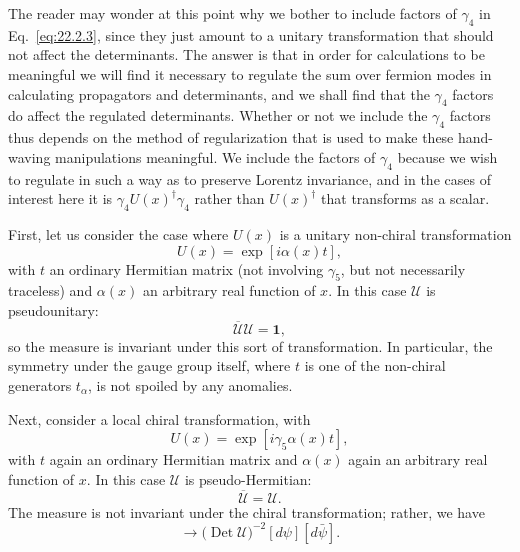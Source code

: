 The reader may wonder at this point why we bother to include factors of
$\gamma_4$ in Eq.~\eqref{eq:22.2.3}, since they just amount to a unitary
transformation that should not affect the determinants. The answer is that
in order for calculations to be meaningful we will find it necessary to
regulate the sum over fermion modes in calculating propagators and
determinants, and we shall find that the $\gamma_4$ factors do affect the
regulated determinants. Whether or not we include the $\gamma_4$ factors
thus depends on the method of regularization that is used to make these
hand-waving manipulations meaningful. We include the factors of $\gamma_4$
because we wish to regulate in such a way as to preserve Lorentz
invariance, and in the cases of interest here it is
$\gamma_4U(x)^\dagger\gamma_4$ rather than $U(x)^\dagger$ that transforms
as a scalar.

First, let us consider the case where $U(x)$ is a unitary non-chiral
transformation
\begin{equation}
 U(x)=\exp[i\alpha(x)t],
 \tag{22.2.4}\label{eq:22.2.4}
\end{equation}
with $t$ an ordinary Hermitian matrix (not involving $\gamma_5$, but not
necessarily traceless) and $\alpha(x)$ an arbitrary real function of $x$.
In this case $\mathcal U$ is pseudounitary:
\begin{equation}
 \overline{\mathcal U}\mathcal U=\mathbf{1},
 \tag{22.2.5}\label{eq:22.2.5}
\end{equation}
so the measure is invariant under this sort of transformation. In
particular, the symmetry under the gauge group itself, where $t$ is one of
the non-chiral generators $t_\alpha$, is not spoiled by any anomalies.

Next, consider a local chiral transformation, with
\begin{equation}
 U(x)=\exp[i\gamma_5\alpha(x)t],
 \tag{22.2.6}\label{eq:22.2.6}
\end{equation}
with $t$ again an ordinary Hermitian matrix and $\alpha(x)$ again an
arbitrary real function of $x$. In this case $\mathcal U$ is
pseudo-Hermitian:
\begin{equation}
 \overline{\mathcal U}=\mathcal U.
 \tag{22.2.7}\label{eq:22.2.7}
\end{equation}
The measure is not invariant under the chiral transformation; rather, we
have
\begin{equation}
 [d\psi][d\bar\psi]\longrightarrow
 \bigl(\operatorname{Det}\mathcal U\bigr)^{-2}[d\psi][d\bar\psi].
 \tag{22.2.8}\label{eq:22.2.8}
\end{equation}

